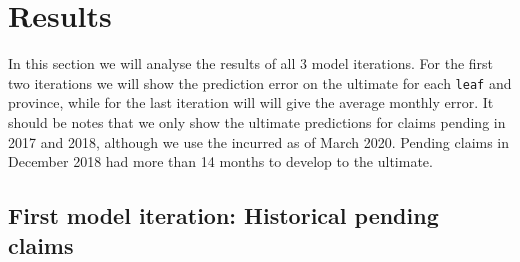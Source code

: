 \section{Results}\label{Sect_Results}
In this section we will analyse the results of all 3 model iterations. For the first two iterations we will show the prediction error on the ultimate for each \texttt{leaf} and province, while for the last iteration will will give the average monthly error. It should be notes that we only show the ultimate predictions for claims pending in 2017 and 2018, although we use the incurred as of March 2020. Pending claims in December 2018 had more than 14 months to develop to the ultimate. 
\subsection{First model iteration: Historical pending claims}
